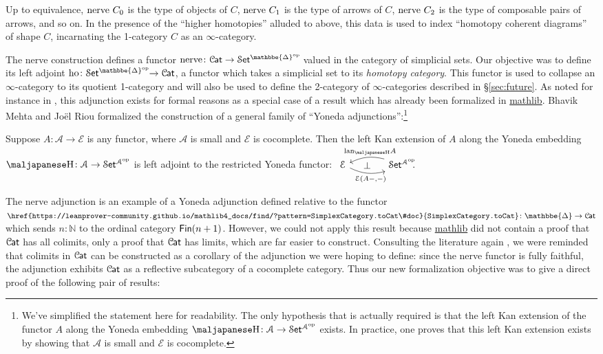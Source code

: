 \documentclass[a4paper,UKenglish,cleveref, autoref, thm-restate]{lipics-v2021}
\newcommand{\op}{\textup{op}}
\newcommand{\ho}{\textup{ho}}
\newcommand{\nerve}{\textup{nerve}}
\newcommand{\lan}{\textup{lan}}
\newcommand{\cat}[1]{\textup{\textsf{#1}}}%
\newcommand{\NN}{\mathbb{N}}
\newcommand{\1}{\mathbbe{1}}
\newcommand{\2}{\mathbbe{2}}
\newcommand{\3}{\mathbbe{3}}
\newcommand{\cA}{\mathcal{A}}
\newcommand{\cE}{\mathcal{E}}
\newcommand{\DDelta}{\mathbbe{\Delta}}
\newcommand{\Fin}{\cat{Fin}}
\newcommand{\Cat}{\mathcal{C}{\kern-.75pt}\cat{at}}
\newcommand{\Set}{\mathcal{S}\cat{et}}
\def\yo{\textrm{\maljapanese\char"48}}
\newcommand{\libmathlib}{\href{https://github.com/leanprover-community/mathlib}{\textsf{mathlib}}}
\newcommand{\ldoc}[2][]{\href{https://leanprover-community.github.io/mathlib4_docs/find/?pattern=#1#2\#doc}{\texttt{#2}}}
\newcommand{\cdoc}[2][]{\href{https://leanprover-community.github.io/mathlib4_docs/find/?pattern=CategoryTheory.#1#2\#doc}{\texttt{#2}}}
\begin{document}
Up to equivalence, $\nerve\ C_0$ is the type of objects of $C$, $\nerve\ C_1$ is the type of arrows of $C$, $\nerve\ C_2$ is the type of composable pairs of arrows, and so on. In the presence of the ``higher homotopies'' alluded to above, this data is used to index ``homotopy coherent diagrams'' of shape $C$, incarnating the 1-category $C$ as an $\infty$-category.

The nerve construction defines a functor $\nerve \colon \Cat \to \Set^{\DDelta^\op}\!$ valued in the category of simplicial sets. Our objective was to define its left adjoint $\ho \colon \Set^{\DDelta^\op}\!\! \to \Cat$, a functor which takes a simplicial set to its \emph{homotopy category}. This functor is used to collapse an $\infty$-category to its quotient 1-category and will also be used to define the 2-category of $\infty$-categories described in \S\ref{sec:future}. As noted for instance in \cite[6.5.iv]{Riehl:2016cc}, this adjunction exists for formal reasons as a special case of a result which has already been formalized in \libmathlib{}. Bhavik Mehta and Jo\"{e}l Riou formalized the construction of a general family of ``Yoneda adjunctions'':\footnote{We've simplified the statement here for readability. The only hypothesis that is actually required is that the left Kan extension of the functor $A$ along the Yoneda embedding $\yo \colon \cA \to \Set^{\cA^\op}$ exists. In practice, one proves that this left Kan extension exists by showing that $\cA$ is small and $\cE$ is cocomplete.}

\begin{theorem}[\cdoc{Presheaf.yonedaAdjunction}] Suppose $A \colon \cA \to \cE$ is any functor,  where $\cA$ is small and $\cE$ is cocomplete.
 Then the left Kan extension of $A$ along the Yoneda embedding $\yo \colon \cA \to \Set^{\cA^\op}$ is left adjoint to the restricted Yoneda functor:
  $ \begin{tikzcd}[column sep=large] \cE \arrow[r, bend right=20, "{\cE(A-,-)}"' pos=.6] \arrow[r, phantom, "\bot"] & \Set^{\cA^\op}\!\!. \arrow[l, bend right=20, "{\lan_{\yo}A}"' pos=.4]
  \end{tikzcd}$
\end{theorem}

The nerve adjunction is an example of a Yoneda adjunction defined relative to the functor $\ldoc{SimplexCategory.toCat} \colon \DDelta \to \Cat$ which sends $n : \NN$ to the ordinal category $\Fin(n+1)$. However, we could not apply this result because \libmathlib{} did not contain a proof that $\Cat$ has all colimits, only a proof that $\Cat$ has limits, which are far easier to construct.  Consulting the literature again \cite[4.5.16]{Riehl:2016cc}, we were reminded that colimits in $\Cat$ can be constructed as a corollary of the adjunction we were hoping to define: since the nerve functor is fully faithful, the adjunction exhibits $\Cat$ as a reflective subcategory of a cocomplete category. Thus our new formalization objective was to give a direct proof of the following pair of results:
\end{document}
